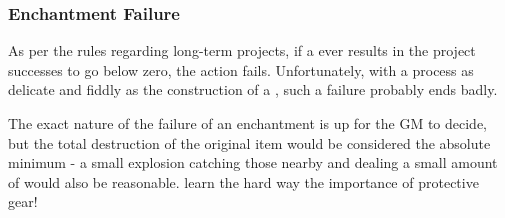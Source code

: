

\subsubsection{Enchantment Failure}

As per the rules regarding long-term projects, if a  ever results in the project successes to go below zero, the action fails. Unfortunately, with a process as delicate and fiddly as the construction of a , such a failure probably ends badly. 

The exact nature of the failure of an enchantment is up for the GM to decide, but the total destruction of the original item would be considered the absolute minimum - a small explosion catching those nearby and dealing a small amount of  would also be reasonable.  learn the hard way the importance of protective gear!







